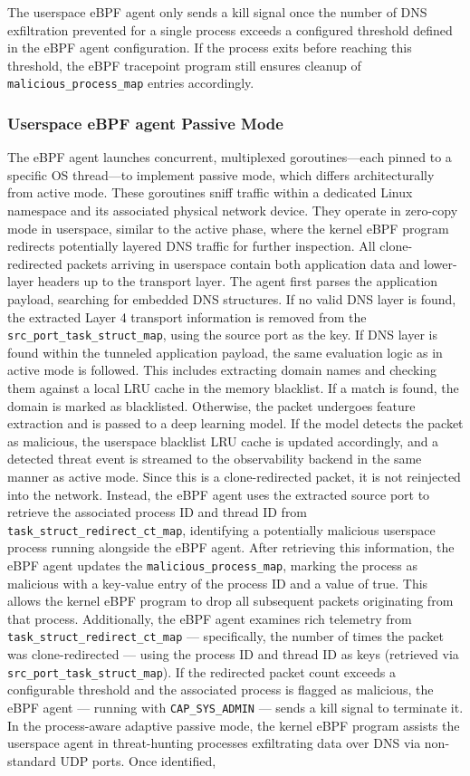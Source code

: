 \documentclass [11pt, proquest] {uwthesis}[2020/02/24]
\begin{document}
The userspace eBPF agent only sends a kill signal once the number of DNS exfiltration prevented for a single process exceeds a configured threshold defined in the eBPF agent configuration. If the process exits before reaching this threshold, the eBPF tracepoint program still ensures cleanup of \texttt{malicious\_process\_map} entries accordingly.

\subsubsection{\textbf{Userspace eBPF agent Passive Mode}}
\label{passive:sec2}
The eBPF agent launches concurrent, multiplexed goroutines—each pinned to a specific OS thread—to implement passive mode, which differs architecturally from active mode. These goroutines sniff traffic within a dedicated Linux namespace and its associated physical network device. They operate in zero-copy mode in userspace, similar to the active phase, where the kernel eBPF program redirects potentially layered DNS traffic for further inspection. All clone-redirected packets arriving in userspace contain both application data and lower-layer headers up to the transport layer. The agent first parses the application payload, searching for embedded DNS structures. If no valid DNS layer is found, the extracted Layer 4 transport information is removed from the \texttt{src\_port\_task\_struct\_map}, using the source port as the key. If DNS layer is found within the tunneled application payload, the same evaluation logic as in active mode is followed. This includes extracting domain names and checking them against a local LRU cache in the memory blacklist. If a match is found, the domain is marked as blacklisted. Otherwise, the packet undergoes feature extraction and is passed to a deep learning model. If the model detects the packet as malicious, the userspace blacklist LRU cache is updated accordingly, and a detected threat event is streamed to the observability backend in the same manner as active mode. Since this is a clone-redirected packet, it is not reinjected into the network. Instead, the eBPF agent uses the extracted source port to retrieve the associated process ID and thread ID from \texttt{task\_struct\_redirect\_ct\_map}, identifying a potentially malicious userspace process running alongside the eBPF agent. After retrieving this information, the eBPF agent updates the \texttt{malicious\_process\_map}, marking the process as malicious with a key-value entry of the process ID and a value of true. This allows the kernel eBPF program to drop all subsequent packets originating from that process. Additionally, the eBPF agent examines rich telemetry from \texttt{task\_struct\_redirect\_ct\_map} — specifically, the number of times the packet was clone-redirected — using the process ID and thread ID as keys (retrieved via \texttt{src\_port\_task\_struct\_map}). If the redirected packet count exceeds a configurable threshold and the associated process is flagged as malicious, the eBPF agent — running with \texttt{CAP\_SYS\_ADMIN} — sends a kill signal to terminate it. In the process-aware adaptive passive mode, the kernel eBPF program assists the userspace agent in threat-hunting processes exfiltrating data over DNS via non-standard UDP ports. Once identified, 
\end{document}
